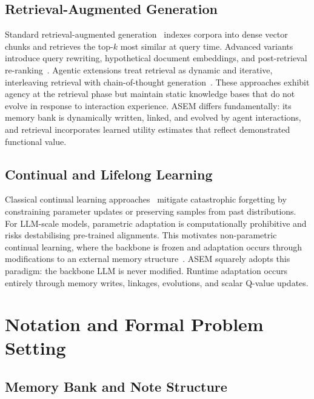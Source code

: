 \documentclass{article}
\newcommand{\ours}{\textsc{ASEM}\xspace}
\begin{document}
\subsection{Retrieval-Augmented Generation}

Standard retrieval-augmented generation~\cite{lewis2020rag} indexes corpora
into dense vector chunks and retrieves the top-$k$ most similar at query time.
Advanced variants introduce query rewriting, hypothetical document embeddings,
and post-retrieval re-ranking~\cite{gao2023rag_survey}.
Agentic extensions treat retrieval as dynamic and iterative, interleaving
retrieval with chain-of-thought generation~\cite{asai2023selfrag,
trivedi2022interleaving}.
These approaches exhibit agency at the retrieval phase but maintain static
knowledge bases that do not evolve in response to interaction experience.
\ours differs fundamentally: its memory bank is dynamically written, linked,
and evolved by agent interactions, and retrieval incorporates learned utility
estimates that reflect demonstrated functional value.

\subsection{Continual and Lifelong Learning}

Classical continual learning approaches~\cite{kirkpatrick2017ewc,
parisi2019continual} mitigate catastrophic forgetting by constraining
parameter updates or preserving samples from past distributions.
For LLM-scale models, parametric adaptation is computationally prohibitive and
risks destabilising pre-trained alignments.
This motivates non-parametric continual learning, where the backbone is frozen
and adaptation occurs through modifications to an external memory
structure~\cite{memrl2026}.
\ours squarely adopts this paradigm: the backbone LLM is never modified.
Runtime adaptation occurs entirely through memory writes, linkages, evolutions,
and scalar Q-value updates.


\section{Notation and Formal Problem Setting}
\label{sec:preliminaries}

\subsection{Memory Bank and Note Structure}
\end{document}
